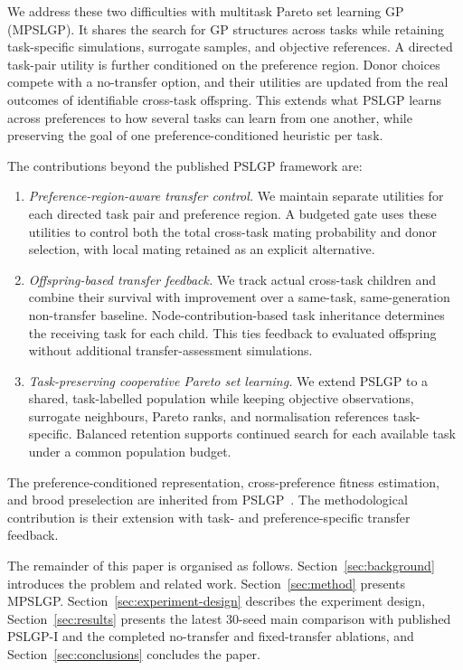 \documentclass[10pt,journal]{IEEEtran}
\newcommand{\resultrevision}[1]{\textcolor{resultrevision}{#1}}
\begin{document}
We address these two difficulties with multitask Pareto set learning GP (MPSLGP). It shares the search for GP structures across tasks while retaining task-specific simulations, surrogate samples, and objective references. A directed task-pair utility is further conditioned on the preference region. Donor choices compete with a no-transfer option, and their utilities are updated from the real outcomes of identifiable cross-task offspring. This extends what PSLGP learns across preferences to how several tasks can learn from one another, while preserving the goal of one preference-conditioned heuristic per task.

The contributions beyond the published PSLGP framework are:
\begin{enumerate}[leftmargin=*,nosep]
    \item \emph{Preference-region-aware transfer control.} We maintain separate utilities for each directed task pair and preference region. A budgeted gate uses these utilities to control both the total cross-task mating probability and donor selection, with local mating retained as an explicit alternative.
    \item \emph{Offspring-based transfer feedback.} We track actual cross-task children and combine their survival with improvement over a same-task, same-generation non-transfer baseline. Node-contribution-based task inheritance determines the receiving task for each child. This ties feedback to evaluated offspring without additional transfer-assessment simulations.
    \item \emph{Task-preserving cooperative Pareto set learning.} We extend PSLGP to a shared, task-labelled population while keeping objective observations, surrogate neighbours, Pareto ranks, and normalisation references task-specific. Balanced retention supports continued search for each available task under a common population budget.
\end{enumerate}
The preference-conditioned representation, cross-preference fitness estimation, and brood preselection are inherited from PSLGP~\cite{xu2026pslgp}. The methodological contribution is their extension with task- and preference-specific transfer feedback.

The remainder of this paper is organised as follows. Section~\ref{sec:background} introduces the problem and related work. Section~\ref{sec:method} presents MPSLGP. Section~\ref{sec:experiment-design} describes the experiment design, Section~\ref{sec:results} presents \resultrevision{the latest 30-seed main comparison with published PSLGP-I and the completed no-transfer and fixed-transfer ablations}, and Section~\ref{sec:conclusions} concludes the paper.
\end{document}
